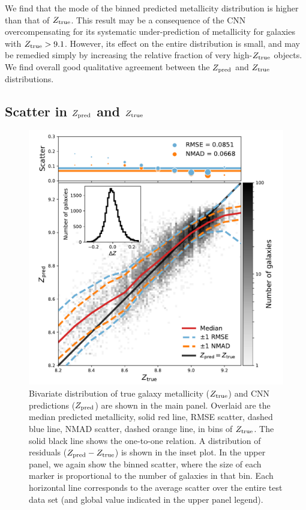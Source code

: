 \documentclass[fleqn,usenatbib]{mnras}
\begin{document}
We find that the mode of the binned predicted metallicity distribution is higher than that of $Z_{\rm true}$. This result may be a consequence of the CNN overcompensating for its systematic under-prediction of metallicity for galaxies with $Z_{\rm true} > 9.1$. However, its effect on the entire distribution is small, and may be remedied simply by increasing the relative fraction of very high-$Z_{\rm true}$ objects. We find overall good qualitative agreement between the $Z_{\rm pred}$ and $Z_{\rm true}$ distributions.

\subsection{Scatter in $Z_{\rm pred}$ and $Z_{\rm true}$}
\begin{figure}
	\includegraphics[width=\columnwidth]{02-prediction_summary.pdf}
	\caption{\label{fig:predicting-metallicity}
		Bivariate distribution of true galaxy metallicity ($Z_{\rm true}$) and CNN predictions ($Z_{\rm pred}$) are shown in the main panel. Overlaid are the median predicted metallicity, solid red line, RMSE scatter, dashed blue line, NMAD scatter, dashed orange line, in bins of $Z_{\rm true}$. The solid black line shows the one-to-one relation. A distribution of residuals ($Z_{\rm pred} - Z_{\rm true}$) is shown in the inset plot. In the upper panel, we again show the binned scatter, where the size of each marker is proportional to the number of galaxies in that bin. Each horizontal line corresponds to the average scatter over the entire test data set (and global value indicated in the upper panel legend).}
\end{figure}
\end{document}
